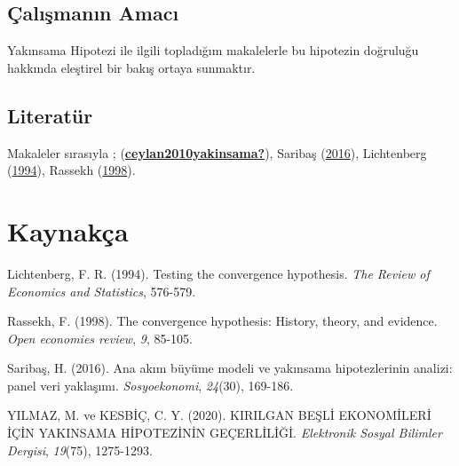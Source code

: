 \documentclass[
  12pt,
]{article}
\newlength{\cslhangindent}
\newlength{\cslentryspacingunit} %
\newenvironment{CSLReferences}[2] %
 {%
  \setlength{\parindent}{0pt}
  \ifodd #1
  \let\oldpar\par
  \def\par{\hangindent=\cslhangindent\oldpar}
  \fi
  \setlength{\parskip}{#2\cslentryspacingunit}
 }%
 {}
\begin{document}
\hypertarget{uxe7alux131ux15fmanux131n-amacux131}{%
\subsection{Çalışmanın Amacı}\label{uxe7alux131ux15fmanux131n-amacux131}}

Yakınsama Hipotezi ile ilgili topladığım makalelerle bu hipotezin doğruluğu hakkında eleştirel bir bakış ortaya sunmaktır.

\hypertarget{literatuxfcr}{%
\subsection{Literatür}\label{literatuxfcr}}

Makaleler sırasıyla ; (\protect\hyperlink{ref-ceylan2010yakinsama}{\textbf{ceylan2010yakinsama?}}), Saribaş (\protect\hyperlink{ref-saribacs2016ana}{2016}), Lichtenberg (\protect\hyperlink{ref-lichtenberg1994testing}{1994}), Rassekh (\protect\hyperlink{ref-rassekh1998convergence}{1998}).

\newpage

\hypertarget{references}{%
\section{Kaynakça}\label{references}}

\hypertarget{refs}{}
\begin{CSLReferences}{1}{0}
\leavevmode{}%
Lichtenberg, F. R. (1994). Testing the convergence hypothesis. \emph{The Review of Economics and Statistics}, 576-579.

\leavevmode{}%
Rassekh, F. (1998). The convergence hypothesis: History, theory, and evidence. \emph{Open economies review}, \emph{9}, 85-105.

\leavevmode{}%
Saribaş, H. (2016). Ana ak{ı}m b{ü}y{ü}me modeli ve yak{ı}nsama hipotezlerinin analizi: panel veri yakla{ş}{ı}m{ı}. \emph{Sosyoekonomi}, \emph{24}(30), 169-186.

\leavevmode{}%
YILMAZ, M. ve KESBİÇ, C. Y. (2020). KIRILGAN BE{Ş}L{İ} EKONOM{İ}LER{İ} {İ}{Ç}{İ}N YAKINSAMA H{İ}POTEZ{İ}N{İ}N GE{Ç}ERL{İ}L{İ}{Ğ}{İ}. \emph{Elektronik Sosyal Bilimler Dergisi}, \emph{19}(75), 1275-1293.

\end{CSLReferences}
\end{document}
